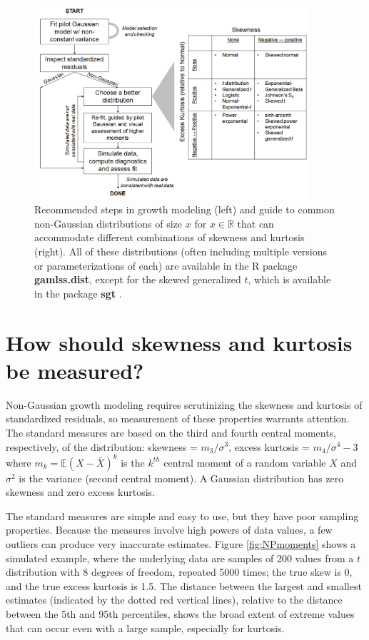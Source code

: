 \documentclass[12pt]{article}
\begin{document}
\begin{spacing}{1.9}
\begin{figure}
\centering
\includegraphics[width=0.9\textwidth]{figures/workflow.png}
\caption{Recommended steps in growth modeling (left) and guide to common non-Gaussian distributions of size $x$ for $x \in \mathbb{R}$ that can accommodate different combinations of skewness and kurtosis (right). 
All of these distributions (often including multiple versions or parameterizations of each) are available in the R package \textbf{gamlss.dist}, 
except for the skewed generalized $t$, which is available in the package \textbf{sgt} \citep{davis-2015}.}
\label{fig:workflow}
\end{figure} 

\section{How should skewness and kurtosis be measured?}
\label{sec:NPmeasures} 
Non-Gaussian growth modeling requires scrutinizing the skewness and kurtosis of standardized residuals, so measurement of these properties warrants attention. 
The standard measures are based on the third and fourth central moments, respectively, of the distribution: skewness = $m_3/\sigma^3$, excess kurtosis = $m_4/\sigma^4-3$
where $m_k = \mathbb{E}(X - \bar{X})^k$ is the $k^{th}$ central moment of a random variable $X$ and $\sigma^2$ is the variance (second central moment). 
A Gaussian distribution has zero skewness and zero excess kurtosis. 

The standard measures are simple and easy to use, but they have poor sampling properties. 
Because the measures involve high powers of data values, a few outliers can produce very inaccurate estimates. 
Figure \ref{fig:NPmoments} shows a simulated example, where the underlying data are samples of 200 values from a $t$ distribution with 
8 degrees of freedom, repeated 5000 times; the true skew is 0, and the true excess kurtosis is 1.5. 
The distance between the largest and smallest estimates (indicated by the dotted red vertical lines), relative to the distance 
between the 5th and 95th percentiles, shows the broad extent of extreme values that can occur even with a large sample, especially for kurtosis. 


\end{spacing}
\end{document}
